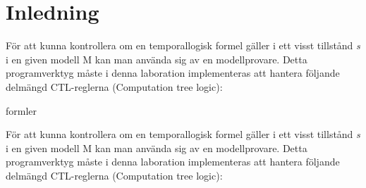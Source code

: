 \section{Inledning}
För att kunna kontrollera om en temporallogisk formel \varphi gäller i ett visst tillstånd \textit{s} i en given modell M kan man använda sig av en modellprovare. Detta programverktyg måste i denna laboration implementeras att hantera följande delmängd CTL-reglerna (Computation tree logic):

formler

För att kunna kontrollera om en temporallogisk formel \varphi gäller i ett visst tillstånd \textit{s} i en given modell M kan man använda sig av en modellprovare. Detta programverktyg måste i denna laboration implementeras att hantera följande delmängd CTL-reglerna (Computation tree logic):